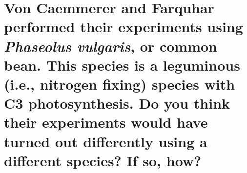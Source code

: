 \documentclass[12pt, notitlepage]{article}   	%
\begin{document}
{\section{\small{Von Caemmerer and Farquhar performed their experiments using
\textit{Phaseolus vulgaris}, or common bean. This species is a leguminous (i.e., nitrogen 
fixing) species with C3 photosynthesis. 
Do you think their experiments would have turned out differently
using a different species? If so, how?}}

} %
\end{document}
